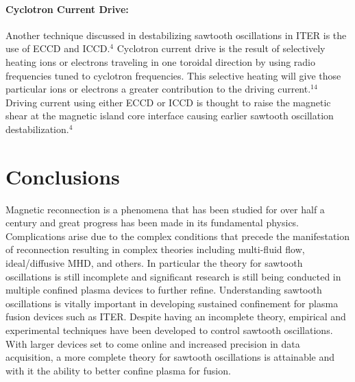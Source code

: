 \documentclass{article}
\begin{document}
\paragraph{Cyclotron Current Drive:}
Another technique discussed in destabilizing sawtooth oscillations in ITER is the use of ECCD and ICCD.$^{4}$  Cyclotron current drive is the result of selectively heating ions or electrons traveling in one toroidal direction by using radio frequencies tuned to cyclotron frequencies.  This selective heating will give those particular ions or electrons a greater contribution to the driving current.$^{14}$  Driving current using either ECCD or ICCD is thought to raise the magnetic shear at the magnetic island core interface causing earlier sawtooth oscillation destabilization.$^{4}$  
\begin{SCfigure}
\centering
{}
\end{SCfigure}
\section{Conclusions}
Magnetic reconnection is a phenomena that has been studied for over half a century and great progress has been made in its fundamental physics.  Complications arise due to the complex conditions that precede the manifestation of reconnection resulting in complex theories including multi-fluid flow, ideal/diffusive MHD, and others.  In particular the theory for sawtooth oscillations is still incomplete and significant research is still being conducted in multiple confined plasma devices to further refine.  Understanding sawtooth oscillations is vitally important in developing sustained confinement for plasma fusion devices such as ITER.  Despite having an incomplete theory, empirical and experimental techniques have been developed to control sawtooth oscillations.  With larger devices set to come online and increased precision in data acquisition, a more complete theory for sawtooth oscillations is attainable and with it the ability to better confine plasma for fusion.
\newpage
\end{document}
